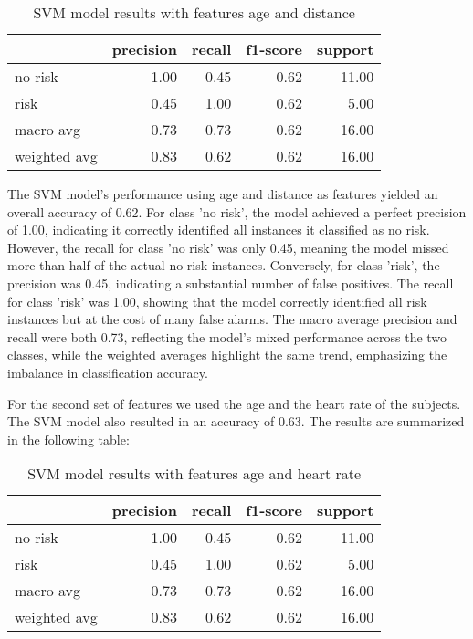 \FloatBarrier
\begin{table}[H]
\centering
\begin{tabular}{lrrrr}
\toprule
{} & precision & recall & f1-score & support \\
\midrule
no risk & 1.00 & 0.45 & 0.62 & 11.00 \\
risk & 0.45 & 1.00 & 0.62 & 5.00 \\
macro avg & 0.73 & 0.73 & 0.62 & 16.00 \\
weighted avg & 0.83 & 0.62 & 0.62 & 16.00 \\
\bottomrule
\end{tabular}
\caption{SVM model results with features age and distance}
\label{table:svmagedist}
\end{table}
\FloatBarrier

The SVM model's performance using age and distance as features yielded an overall accuracy of 0.62. For class 'no risk', the model achieved a perfect precision of 1.00, indicating it correctly identified all instances it classified as no risk. However, the recall for class 'no risk' was only 0.45, meaning the model missed more than half of the actual no-risk instances. Conversely, for class 'risk', the precision was 0.45, indicating a substantial number of false positives. The recall for class 'risk' was 1.00, showing that the model correctly identified all risk instances but at the cost of many false alarms. The macro average precision and recall were both 0.73, reflecting the model's mixed performance across the two classes, while the weighted averages highlight the same trend, emphasizing the imbalance in classification accuracy.

For the second set of features we used the age and the heart rate of the subjects. The SVM model also resulted in an accuracy of 0.63. The results are summarized in the following table:

\FloatBarrier
\begin{table}[H]
\centering
\begin{tabular}{lrrrr}
\toprule
{} & precision & recall & f1-score & support \\
\midrule
no risk & 1.00 & 0.45 & 0.62 & 11.00 \\
risk & 0.45 & 1.00 & 0.62 & 5.00 \\
macro avg & 0.73 & 0.73 & 0.62 & 16.00 \\
weighted avg & 0.83 & 0.62 & 0.62 & 16.00 \\
\bottomrule
\end{tabular}
\caption{SVM model results with features age and heart rate}
\label{table:svmageHR}
\end{table}
\FloatBarrier

